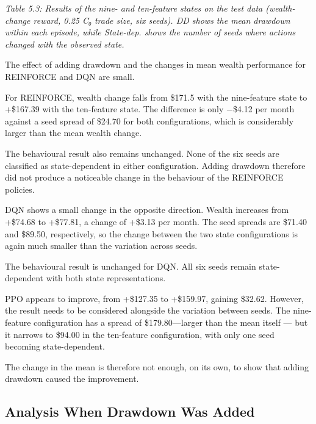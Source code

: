 \emph{Table 5.3: Results of the nine- and ten-feature states on the test
data (wealth-change reward, 0.25 C₀ trade size, six seeds). DD shows the
mean drawdown within each episode, while State-dep. shows the number of
seeds where actions changed with the observed state.}

The effect of adding drawdown and the changes in mean wealth performance
for REINFORCE and DQN are small.

For REINFORCE, wealth change falls from \$171.5 with the nine-feature
state to +\$167.39 with the ten-feature state. The difference is only
−\$4.12 per month against a seed spread of \$24.70 for both
configurations, which is considerably larger than the mean wealth
change.

The behavioural result also remains unchanged. None of the six seeds are
classified as state-dependent in either configuration. Adding drawdown
therefore did not produce a noticeable change in the behaviour of the
REINFORCE policies.

DQN shows a small change in the opposite direction. Wealth increases
from +\$74.68 to +\$77.81, a change of +\$3.13 per month. The seed
spreads are \$71.40 and \$89.50, respectively, so the change between the
two state configurations is again much smaller than the variation across
seeds.

The behavioural result is unchanged for DQN. All six seeds remain
state-dependent with both state representations.

PPO appears to improve, from +\$127.35 to +\$159.97, gaining \$32.62.
However, the result needs to be considered alongside the variation
between seeds. The nine-feature configuration has a spread of
\$179.80---larger than the mean itself --- but it narrows to \$94.00 in
the ten-feature configuration, with only one seed becoming
state-dependent.

The change in the mean is therefore not enough, on its own, to show that
adding drawdown caused the improvement.

\subsection{Analysis When Drawdown Was Added}

